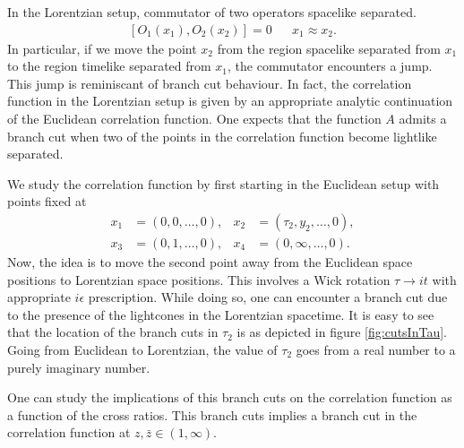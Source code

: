 In the Lorentzian setup, commutator of two operators spacelike separated.
\begin{align}
  \left[ O_1\left( x_1 \right),O_2\left( x_2 \right) \right] = 0 &  & x_1 \approx x_2.
\end{align}
In particular, if we move the point $ x_2 $ from the region spacelike separated from $ x_1 $ to the region timelike separated from $ x_1 $, the commutator encounters a jump.
This jump is reminiscant of branch cut behaviour.
In fact, the correlation function in the Lorentzian setup is given by an appropriate analytic continuation of the Euclidean correlation function.
One expects that the function $ A $ admits a branch cut when two of the points in the correlation function become lightlike separated.

We study the correlation function by first starting in the Euclidean setup with points fixed at
\begin{align}
  x_1 & = \left( 0,0,\dots,0 \right), & x_2 & = \left( \tau_2,y_2,\dots,0 \right), \nonumber \\
  x_3 & = \left( 0,1,\dots,0 \right), & x_4 & = \left( 0,\infty,\dots,0 \right)
  .
\end{align}
Now, the idea is to move the second point away from the Euclidean space positions to Lorentzian space positions.
This involves a Wick rotation $ \tau \rightarrow i t $ with appropriate $ i\epsilon $ prescription.
While doing so, one can encounter a branch cut due to the presence of the lightcones in the Lorentzian spacetime.
It is easy to see that the location of the branch cuts in $ \tau_2 $ is as depicted in figure \ref{fig:cutsInTau}.
Going from Euclidean to Lorentzian, the value of $ \tau_2 $ goes from a real number to a purely imaginary number.

One can study the implications of this branch cuts on the correlation function as a function of the cross ratios.
This branch cuts implies a branch cut in the correlation function at $ z,\bar{z} \in \left( 1,\infty \right)  $.

